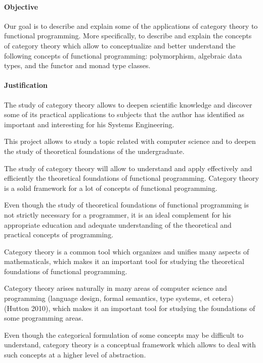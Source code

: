 \paragraph{Objective}

Our goal is to describe and explain some of the applications of
category theory to functional programming. More specifically, to
describe and explain the concepts of category theory which allow to
conceptualize and better understand the following concepts of
functional programming: polymorphism, algebraic data types, and the
functor and monad type classes.

\paragraph{Justification}

The study of category theory allows to deepen scientific knowledge and
discover some of its practical applications to subjects that the
author has identified as important and interesting for his Systems
Engineering.

This project allows to study a topic related with computer science and
to deepen the study of theoretical foundations of the undergraduate.

The study of category theory will allow to understand and apply
effectively and efficiently the theoretical foundations of functional
programming. Category theory is a solid framework for a lot of
concepts of functional programming.

Even though the study of theoretical foundations of functional
programming is not strictly necessary for a programmer, it is an ideal
complement for his appropriate education and adequate understanding of
the theoretical and practical concepts of programming.

Category theory is a common tool which organizes and unifies many
aspects of mathematicals, which makes it an important tool for
studying the theoretical foundations of functional programming.

Category theory arises naturally in many areas of computer science and
programming (language design, formal semantics, type systems, et
cetera) (Hutton 2010), which makes it an important tool for studying
the foundations of some programming areas.

Even though the categorical formulation of some concepts may be
difficult to understand, category theory is a conceptual framework
which allows to deal with such concepts at a higher level of
abstraction.

